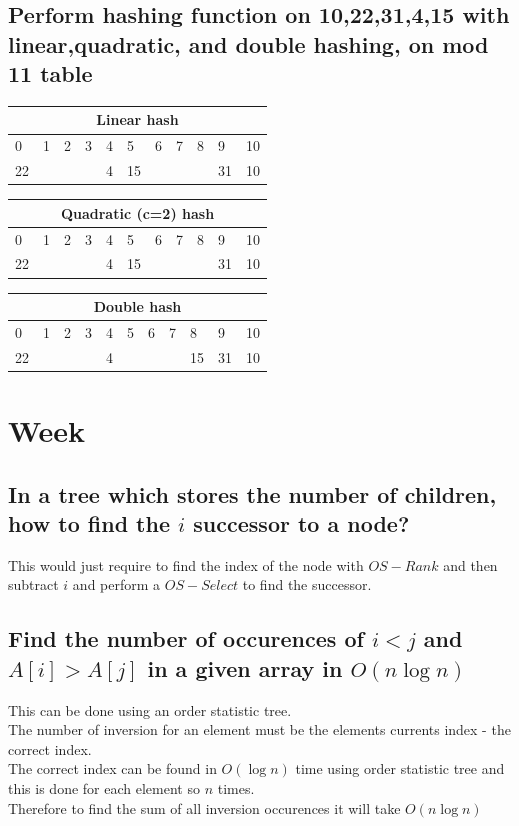 \documentclass[12pt, a4paper]{article}
\begin{document}
			\subsection{Perform hashing function on 10,22,31,4,15 with linear,quadratic, and double hashing, on mod 11 table}
					\begin{table}[h!]
					  \center
					  \begin{tabular}{|l|l|l|l|l|l|l|l|l|l|l|}
								 \hline
								 \multicolumn{11}{|c|}{Linear hash}\\
								 \hline
								 0 & 1 & 2 & 3 & 4 &5 &6 &7&8&9&10\\\hline
								 22&&&&4&15&&&&31&10\\\hline
						\end{tabular}
				\end{table}
				\begin{table}[h!]
					  \center
					  \begin{tabular}{|l|l|l|l|l|l|l|l|l|l|l|}
								  \hline
								  \multicolumn{11}{|c|}{Quadratic (c=2) hash}\\
								 \hline
								 0 & 1 & 2 & 3 & 4 &5 &6 &7&8&9&10\\\hline
								 22&&&&4&15&&&&31&10\\\hline
						\end{tabular}
				\end{table}
				\begin{table}[h!]
					  \center
					  \begin{tabular}{|l|l|l|l|l|l|l|l|l|l|l|}
								 \hline
								 \multicolumn{11}{|c|}{Double hash}\\
								 \hline
								 0 & 1 & 2 & 3 & 4 &5 &6 &7&8&9&10\\\hline
								 22&&&&4&&&&15&31&10\\\hline
						\end{tabular}
				\end{table}
		\section{Week}
			\subsection{In a tree which stores the number of children, how to find the $i$ successor to a node?}
				This would just require to find the index of the node with $OS-Rank$ and then subtract $i$ and perform a $OS-Select$ to find the successor.
			\subsection{Find the number of occurences of $i < j$ and $A[i] > A[j]$ in a given array in $O(n \log n)$}
				This can be done using an order statistic tree.\\
				The number of inversion for an element must be the elements currents index - the correct index.\\
				The correct index can be found in $O(\log n)$ time using order statistic tree and this is done for each element so $n$ times.\\
				Therefore to find the sum of all inversion occurences it will take $O(n \log n)$
\end{document}
